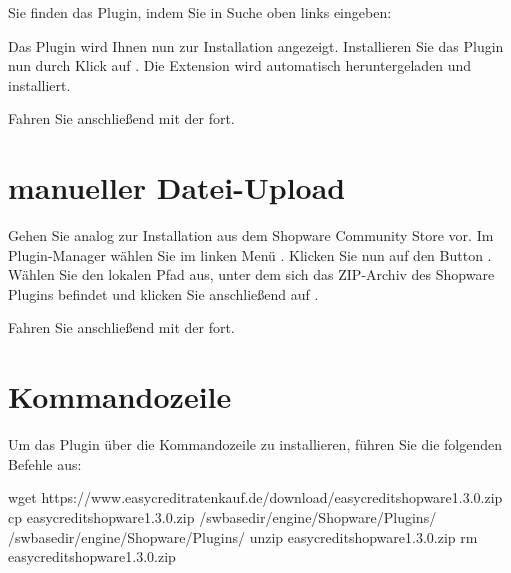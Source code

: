 \documentclass[a4paper,10pt,openany,oneside,ngerman]{sphinxmanual}
\begin{document}
Sie finden das Plugin, indem Sie in Suche oben links  eingeben:

\noindent{}

Das Plugin wird Ihnen nun zur Installation angezeigt. Installieren Sie das Plugin nun durch Klick auf .
Die Extension wird automatisch heruntergeladen und installiert.

Fahren Sie anschließend mit der {\hyperref[\detokenize{configuration:configuration}]{}} fort.


\section{manueller Datei-Upload}
\label{\detokenize{installation:manueller-datei-upload}}
Gehen Sie analog zur Installation aus dem Shopware Community Store vor. Im Plugin-Manager wählen Sie im linken Menü . Klicken Sie nun auf den Button . Wählen Sie den lokalen Pfad aus, unter dem sich das ZIP-Archiv des Shopware Plugins befindet und klicken Sie anschließend auf .

Fahren Sie anschließend mit der {\hyperref[\detokenize{configuration:configuration}]{}} fort.

\noindent{}


\section{Kommandozeile}
\label{\detokenize{installation:kommandozeile}}
Um das Plugin über die Kommandozeile zu installieren, führen Sie die folgenden Befehle aus:

%
\begin{sphinxVerbatim}[commandchars=\\\{\}]
 wget https://www.easycredit\PYGZhy{}ratenkauf.de/download/easycredit\PYGZhy{}shopware\PYGZhy{}1.3.0.zip
 cp easycredit\PYGZhy{}shopware\PYGZhy{}1.3.0.zip /sw\PYGZhy{}base\PYGZhy{}dir/engine/Shopware/Plugins/
  /sw\PYGZhy{}base\PYGZhy{}dir/engine/Shopware/Plugins/
 unzip easycredit\PYGZhy{}shopware\PYGZhy{}1.3.0.zip
 rm easycredit\PYGZhy{}shopware\PYGZhy{}1.3.0.zip
\end{sphinxVerbatim}
\end{document}
